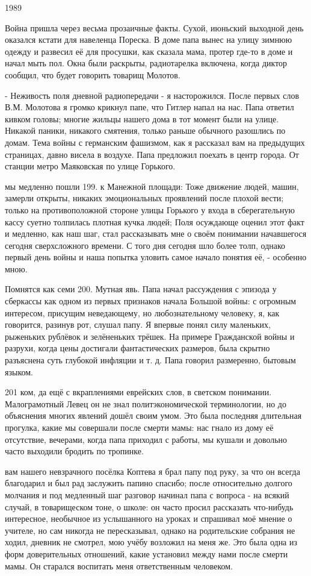 1989

Война пришла через весьма прозаичные факты. Сухой, июньский выходной день оказался кстати для навеленца Пореска. В доме папа вынес на улицу зимнюю одежду и развесил её для просушки, как сказала мама, протер где-то в доме и начал мыть пол. Окна были раскрыты, радиотарелка включена, когда диктор сообщил, что будет говорить товарищ Молотов.

- Неживость поля дневной радиопередачи - я насторожился. После первых слов В.М. Молотова я громко крикнул папе, что Гитлер напал на нас. Папа ответил кивком головы; многие жильцы нашего дома в тот момент были на улице. Никакой паники, никакого смятения, только раньше обычного разошлись по домам. Тема войны с германским фашизмом, как я рассказал вам на предыдущих страницах, давно висела в воздухе. Папа предложил поехать в центр города. От станции метро Маяковская по улице Горького.

мы медленно пошли 199. к Манежной площади: Тоже движение людей, машин, замерли открыты, никаких эмоциональных проявлений после плохой вести; только на противоположной стороне улицы Горького у входа в сберегательную кассу суетно толпилась плотная кучка людей; Поля осуждающе оценил этот факт и медленно, как наш шаг, стал рассказывать мне о своём понимании начавшегося сегодня сверхсложного времени. С того дня сегодня шло более толп, однако первый день войны и наша попытка уловить самое начало понятия её, - особенно мною.

Помнятся как семи 200. Мутная явь. Папа начал рассуждения с эпизода у сберкассы как одном из первых признаков начала Большой войны: с огромным интересом, присущим неведающему, но любознательному человеку, я, как говорится, разинув рот, слушал папу. Я впервые понял силу маленьких, рыженьких рублёвок и зелёненьких трёшек. На примере Гражданской войны и разрухи, когда цены достигали фантастических размеров, была скрытно разъяснена суть глубокой инфляции и т. д. Папа говорил размеренно, бытовым языком.

201 ком, да ещё с вкраплениями еврейских слов, в светском понимании. Малограмотный Левец он не знал политэкономической терминологии, но до объяснения многих явлений дошёл своим умом. Это была последняя длительная прогулка, какие мы совершали после смерти мамы: нас гнало из дому её отсутствие, вечерами, когда папа приходил с работы, мы кушали и довольно часто выходили бродить по тропинке.

вам нашего невзрачного посёлка Коптева я брал папу под руку, за что он всегда благодарил и был рад заслужить папино спасибо; после относительно долгого молчания и под медленный шаг разговор начинал папа с вопроса - на всякий случай, в товарищеском тоне, о школе: он часто просил рассказать что-нибудь интересное, необычное из услышанного на уроках и спрашивал моё мнение о учителе, но сам никогда не пересказывал, однако на родительские собрания не ходил, дневник не смотрел, мою учёбу возложил на меня же. Это была одна из форм доверительных отношений, какие установил между нами после смерти мамы. Он старался воспитать меня ответственным человеком.

